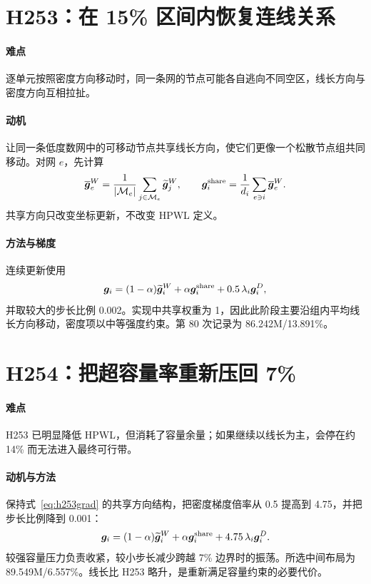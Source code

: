 \documentclass[UTF8,a4paper,11pt]{ctexrep}
\newcommand{\Mcal}{\mathcal{M}}
\begin{document}
\section{H253：在 15\% 区间内恢复连线关系}
\paragraph{难点}
逐单元按照密度方向移动时，同一条网的节点可能各自逃向不同空区，线长方向与密度方向互相拉扯。

\paragraph{动机}
让同一条低度数网中的可移动节点共享线长方向，使它们更像一个松散节点组共同移动。对网 $e$，先计算
\begin{equation}
 \overline{\bm g}_e^W=\frac{1}{|\Mcal_e|}\sum_{j\in\Mcal_e}\widetilde{\bm g}_j^W,
 \qquad
 \bm g_i^{\rm share}=\frac{1}{d_i}\sum_{e\ni i}\overline{\bm g}_e^W. \label{eq:sharedgrad}
\end{equation}
共享方向只改变坐标更新，不改变 HPWL 定义。

\paragraph{方法与梯度}
连续更新使用
\begin{equation}
 \bm g_i=(1-\alpha)\widetilde{\bm g}_i^W+\alpha\bm g_i^{\rm share}
 +0.5\,\lambda_i\bm g_i^D, \label{eq:h253grad}
\end{equation}
并取较大的步长比例 0.002。实现中共享权重为 1，因此此阶段主要沿组内平均线长方向移动，密度项以中等强度约束。第 80 次记录为 86.242M/13.891\%。

\section{H254：把超容量率重新压回 7\%}
\paragraph{难点}
H253 已明显降低 HPWL，但消耗了容量余量；如果继续以线长为主，会停在约 14\% 而无法进入最终可行带。

\paragraph{动机与方法}
保持式~\eqref{eq:h253grad} 的共享方向结构，把密度梯度倍率从 0.5 提高到 4.75，并把步长比例降到 0.001：
\begin{equation}
 \bm g_i=(1-\alpha)\widetilde{\bm g}_i^W+\alpha\bm g_i^{\rm share}
 +4.75\,\lambda_i\bm g_i^D. \label{eq:h254grad}
\end{equation}
较强容量压力负责收紧，较小步长减少跨越 7\% 边界时的振荡。所选中间布局为 89.549M/6.557\%。线长比 H253 略升，是重新满足容量约束的必要代价。
\end{document}
